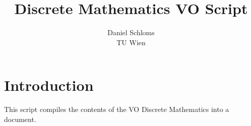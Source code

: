 \documentclass{article}
\title{Discrete Mathematics VO Script}
\author{Daniel Schloms\\
        TU Wien}
\date{}
\theoremstyle{definition}
\begin{document}
\maketitle

\section{Introduction}

This script compiles the contents of the VO Discrete Mathematics into a document.








\end{document}
